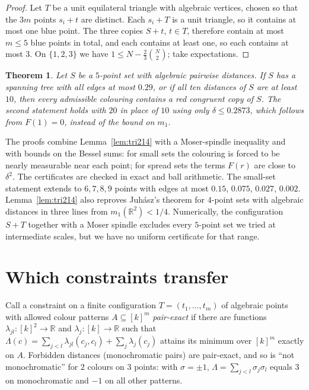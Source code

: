 \documentclass[11pt]{amsart}
\newtheorem{theorem}{Theorem}[section]
\theoremstyle{definition}
\newcommand{\R}{\mathbb{R}}
\begin{document}
\begin{proof}
Let $T$ be a unit equilateral triangle with algebraic vertices, chosen so that the $3m$ points $s_i+t$ are distinct. Each $s_i+T$ is a unit triangle, so it contains at most one blue point. The three copies $S+t$, $t\in T$, therefore contain at most $m\le5$ blue points in total, and each contains at least one, so each contains at most $3$. On $\{1,2,3\}$ we have $1\le N-\frac23\binom N2$; take expectations.
\end{proof}

\begin{theorem}\label{thm:214}
Let $S$ be a $5$-point set with algebraic pairwise distances. If $S$ has a spanning tree with all edges at most $0.29$, or if all ten distances of $S$ are at least $10$, then every admissible colouring contains a red congruent copy of $S$. The second statement holds with $20$ in place of $10$ using only $\delta\le0.2873$, which follows from $F(1)=0$, instead of the bound on $m_1$.
\end{theorem}

The proofs combine Lemma~\ref{lem:tri214} with a Moser-spindle inequality and with bounds on the Bessel sums: for small sets the colouring is forced to be nearly measurable near each point; for spread sets the terms $F(r)$ are close to $\delta^2$. The certificates are checked in exact and ball arithmetic. The small-set statement extends to $6,7,8,9$ points with edges at most $0.15$, $0.075$, $0.027$, $0.002$. Lemma~\ref{lem:tri214} also reproves Juh\'asz's theorem for $4$-point sets with algebraic distances in three lines from $m_1(\R^2)<1/4$. Numerically, the configuration $S+T$ together with a Moser spindle excludes every $5$-point set we tried at intermediate scales, but we have no uniform certificate for that range.

\section{Which constraints transfer}\label{sec:which}

Call a constraint on a finite configuration $T=(t_1,\dots,t_m)$ of algebraic points with allowed colour patterns $A\subseteq[k]^m$ \emph{pair-exact} if there are functions $\lambda_{jl}\colon[k]^2\to\R$ and $\lambda_j\colon[k]\to\R$ such that $\Lambda(c)=\sum_{j<l}\lambda_{jl}(c_j,c_l)+\sum_j\lambda_j(c_j)$ attains its minimum over $[k]^m$ exactly on $A$. Forbidden distances (monochromatic pairs) are pair-exact, and so is ``not monochromatic'' for $2$ colours on $3$ points: with $\sigma=\pm1$, $\Lambda=\sum_{j<l}\sigma_j\sigma_l$ equals $3$ on monochromatic and $-1$ on all other patterns.
\end{document}
